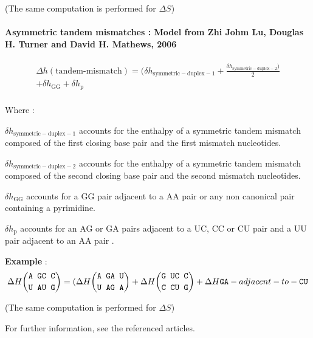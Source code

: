 \documentclass{article}
\begin{document}
       (The same computation is performed for $\Delta S$)    

\paragraph{Asymmetric tandem mismatches : \textbf{Model from Zhi Johm Lu, Douglas H. Turner and David H. Mathews, 2006}}

\begin{multline*}
\Delta h {(\mbox{tandem-mismatch})} =
( \delta{}h_\mathrm{symmetric-duplex-1} +
\frac{\delta{}h_\mathrm{symmetric-duplex-2} )}{2} \\ +
\delta{}h_\mathrm{GG} +
\delta{}h_\mathrm{p}\\
\end{multline*}

Where :

$\delta{}h_\mathrm{symmetric-duplex-1}$ accounts for the enthalpy of a symmetric tandem mismatch composed of
the first closing base pair and the first mismatch nucleotides.

$\delta{}h_\mathrm{symmetric-duplex-2}$ accounts for the enthalpy of a symmetric tandem mismatch composed of
the second closing base pair and the second mismatch nucleotides.

$\delta{}h_\mathrm{GG}$ accounts for a GG pair adjacent to a AA pair or any non canonical pair containing a pyrimidine.

$\delta{}h_\mathrm{p}$ accounts for an AG or GA pairs adjacent to a UC, CC or CU pair and a UU pair adjacent to an AA pair .

\textbf{Example} :
\begin{multline*}
\Delta H {\mbox{\texttt{A GC C}} \choose \mbox{\texttt{U AU G}}} =
( \Delta H {\mbox{\texttt{A GA U}} \choose \mbox{\texttt{U AG A}}} + 
\Delta H {\mbox{\texttt{G UC C}} \choose \mbox{\texttt{C CU G}}} +
\Delta H {\mbox{\texttt{GA}} -adjacent-to- \mbox{\texttt{CU}} } \\
\end{multline*}

       (The same computation is performed for $\Delta S$)
       
For further information, see the referenced articles.
\end{document}
